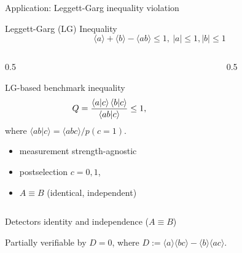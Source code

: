 \documentclass{beamer}
\begin{document}
	\begin{frame}{Application: Leggett-Garg inequality violation}

		\begin{block}{Leggett-Garg (LG) Inequality}
		$$
		\langle a \rangle + \langle b \rangle - \langle ab \rangle \leq 1, \:|a|\leq 1,|b|\leq 1
		$$
		\end{block}

	
		\begin{columns}
			\begin{column}{0.5\textwidth}
				\begin{block}{LG-based benchmark inequality}
					$$
						Q = \frac{\braket{a}{c}\braket{b}{c}}{\braket{ab}{c}} \leq 1,
					$$
					where $\langle ab|c\rangle=\langle abc\rangle/p(c=1)$.
					\begin{itemize}
						\item measurement strength-agnostic
						\item postselection $c=0,1$,
						\item  $A\equiv B$ (identical, independent)
					\end{itemize}
	
				
				\end{block}
			\end{column}
		
			\begin{column}{0.5\textwidth}
				\begin{center}
				\end{center}
			\end{column}
	
		\end{columns}
	
		\begin{block}{Detectors identity and independence ($A \equiv B$)}
			
			Partially verifiable by $D = 0$, where $D := \langle a \rangle \langle bc \rangle - \langle b \rangle \langle ac \rangle $.
			
		\end{block}
	
	
	\end{frame}
\end{document}
